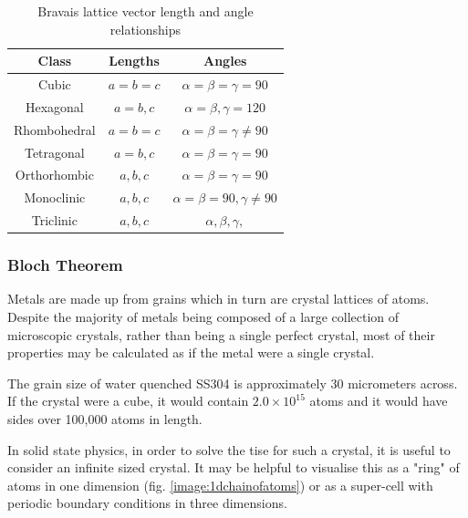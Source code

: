 \begin{table}[h]
\begin{center}
\renewcommand{\arraystretch}{1.2}
\begin{tabular}{c c c}
\hline\hline
Class & Lengths & Angles \\
\hline\hline
Cubic & $a = b = c$ & $ \alpha = \beta = \gamma = 90 $ \\
Hexagonal & $a = b, c $ & $ \alpha = \beta, \gamma = 120 $ \\
Rhombohedral & $a = b = c $ & $ \alpha = \beta = \gamma \neq 90 $ \\
Tetragonal & $a = b, c $ & $ \alpha = \beta = \gamma = 90 $ \\
Orthorhombic & $a, b, c $ & $ \alpha = \beta = \gamma = 90 $ \\
Monoclinic & $a, b, c $ & $ \alpha = \beta = 90, \gamma \neq 90 $ \\
Triclinic & $a, b, c $ & $ \alpha, \beta, \gamma, $ \\
\hline
\end{tabular}
\caption{Bravais lattice vector length and angle relationships}
\label{table:bravaisvectors}
\end{center}
\end{table}



\subsubsection{Bloch Theorem}
\label{section:blochtheorem}

Metals are made up from grains which in turn are crystal lattices of atoms.  Despite the majority of metals being composed of a large collection of microscopic crystals, rather than being a single perfect crystal, most of their properties may be calculated as if the metal were a single crystal.

The grain size of water quenched SS304 is approximately 30 micrometers across\cite{grainsizesteel}.  If the crystal were a cube, it would contain $2.0 \times 10^{15}$ atoms and it would have sides over 100,000 atoms in length.

In solid state physics, in order to solve the \acrshort{tise} for such a crystal, it is useful to consider an infinite sized crystal.  It may be helpful to visualise this as a "ring" of atoms in one dimension (fig. \ref{image:1dchainofatoms}) or as a super-cell with periodic boundary conditions in three dimensions.


